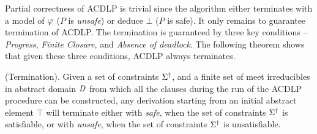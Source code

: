 Partial correctness of ACDLP is trivial since the algorithm either terminates with 
a model of $\varphi$ ($P$ is \emph{unsafe}) or deduce $\bot$ ($P$ is safe).  It 
only remains to guarantee termination of ACDLP.  The termination is guaranteed 
by three key conditions -- \emph{Progress}, \emph{Finite Closure}, and \emph{Absence 
of deadlock}.  The following theorem shows that given these three conditions, ACDLP 
always terminates.
%
\begin{theorem} (Termination).
Given a set of constraints $\Sigma^\dagger$, and a finite set of meet irreducibles 
in abstract domain $\mathit{D}$ from which all the clauses during the run of the ACDLP 
procedure can be constructed, any derivation starting from an initial abstract 
element $\top$ will terminate either with \emph{safe}, when the set of constraints 
$\Sigma^\dagger$ is satisfiable, or with \emph{unsafe}, when the set of constraints 
$\Sigma^\dagger$ is unsatisfiable. 
\end{theorem}
%
